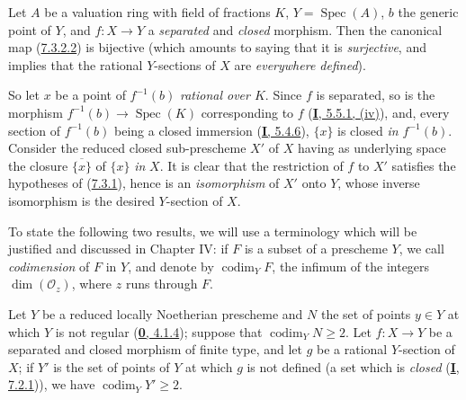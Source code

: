 \begin{proposition}[7.3.3]
\label{II.7.3.3}
Let $A$ be a valuation ring with field of fractions $K$,
$Y=\operatorname{Spec}(A)$, $b$ the generic point of $Y$, and $f:X\to Y$ a
\emph{separated} and \emph{closed} morphism. Then the canonical map
\textup{(\hyperref[II.7.3.2.2]{7.3.2.2})} is bijective \textup{(which amounts to saying
that it is \emph{surjective}, and implies that the rational $Y$-sections of
$X$ are \emph{everywhere defined})}.
\end{proposition}

So let $x$ be a point of $f^{-1}(b)$ \emph{rational over $K$}. Since $f$ is
separated, so is the morphism
$f^{-1}(b)\to\operatorname{Spec}(K)$ corresponding to $f$
(\hyperref[I.5.5.1]{\textbf{I}, 5.5.1, (iv)}), and, every section of $f^{-1}(b)$
being a closed immersion (\hyperref[I.5.4.6]{\textbf{I}, 5.4.6}), $\{x\}$ is closed
\emph{in $f^{-1}(b)$}. Consider the reduced closed sub-prescheme $X'$ of
$X$ having as underlying space the closure $\overline{\{x\}}$ of $\{x\}$
\emph{in} $X$. It is clear that the restriction of $f$ to $X'$ satisfies the hypotheses
of (\hyperref[II.7.3.1]{7.3.1}), hence is an \emph{isomorphism} of $X'$ onto
$Y$, whose inverse isomorphism is the desired $Y$-section of $X$.

\begin{env}[7.3.4]
\label{II.7.3.4}
To state the following two results, we will use a
terminology which will be justified and discussed in Chapter IV: if $F$ is
a subset
of a prescheme $Y$, we call \emph{codimension} of $F$ in $Y$, and denote by
$\operatorname{codim}_YF$, the infimum of the integers
$\dim(\mathcal{O}_z)$, where $z$ runs through $F$.
\end{env}

\begin{corollary}[7.3.5]
\label{II.7.3.5}
Let $Y$ be a reduced locally Noetherian prescheme and $N$ the set of
points $y\in Y$ at which $Y$ is not regular
\textup{(\hyperref[0.4.1.4]{\textbf{0}, 4.1.4})}; suppose that
$\operatorname{codim}_YN\geq2$. Let $f:X\to Y$ be a \textup{separated} and \textup{closed}
morphism of finite type, and let $g$ be a rational $Y$-section of $X$; if $Y'$
is the set of points of $Y$ at which $g$ is not defined \textup{(a set which is
\emph{closed} (\hyperref[I.7.2.1]{\textbf{I}, 7.2.1}))}, we have
$\operatorname{codim}_YY'\geq2$.
\end{corollary}

